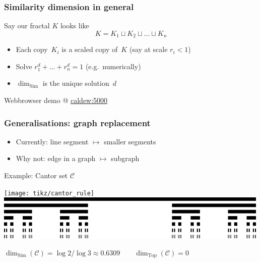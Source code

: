 \documentclass[12pt]{beamer}
\newcommand\dimT{\operatorname{dim}_{\operatorname{Top}}}
\newcommand\dimS{\operatorname{dim}_{\operatorname{Sim}}}
\begin{document}
\begin{frame}
\frametitle{Similarity dimension in general}
Say our fractal $K$ looks like
{\Large
\begin{equation*}
	K = K_1 \sqcup K_2 \sqcup \dots \sqcup K_n
\end{equation*}
}
\vspace{-0.5em}
\pause
\begin{itemize}[<+->]
	\item Each copy~$K_i$ is a scaled copy of~$K$ {\small\hfill(say at scale $r_i < 1$)}
	\item Solve $r_1^d + \dots + r_n^d = 1$       {\small\hfill(e.g.\ numerically)}
	\item $\dimS$ is the unique solution~$d$
\end{itemize}
\pause[\thebeamerpauses]
\begin{center}
\large
Webbrowser demo @ \href{http://caldew:5000}{\alert{\ttfamily caldew:5000}} \hfil
{}
\end{center}
\end{frame}

\begin{frame}[t]
\frametitle{Generalisations: graph replacement}
\begin{itemize}
	\item \alert{Currently:} line segment $\mapsto$ smaller segments \pause
	\item \alert{Why not:} edge in a graph $\mapsto$ subgraph \pause
\end{itemize}
Example: Cantor set $\mathcal C$
\begin{center}
	\vspace{-0.5em}
	\texttt{[image: tikz/cantor\_rule]} \pause \\
	\includegraphics[width=\linewidth]{../media/Cantor_set_construction}
	\pause
	
	\bigskip
	$\dimS(\mathcal C) = \log 2 / \log 3 \approx 0.6309 \qquad \dimT(\mathcal C) = 0$
\end{center}
\end{frame}
\end{document}
